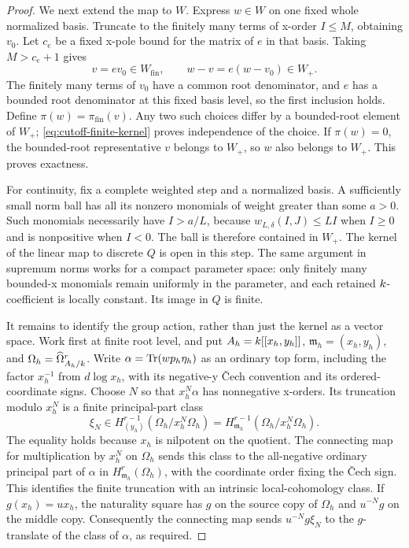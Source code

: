 \begin{proof}
We next extend the map to $W$.  Express $w\in W$ on one fixed whole
normalized basis.  Truncate to the finitely many terms of x-order
$I\leq M$, obtaining $v_0$.  Let $c_e$ be a fixed x-pole bound for
the matrix of $e$ in that basis.  Taking $M>c_e+1$ gives
\[
 v=ev_0\in W_{\mathrm{fin}},\qquad
 w-v=e(w-v_0)\in W_+.
\]
The finitely many terms of $v_0$ have a common root denominator, and
$e$ has a bounded root denominator at this fixed basis level, so the
first inclusion holds.  Define $\pi(w)=\pi_{\mathrm{fin}}(v)$.
Any two such choices differ by a bounded-root element of $W_+$;
\cref{eq:cutoff-finite-kernel} proves independence of the choice.
If $\pi(w)=0$, the bounded-root representative $v$ belongs to $W_+$,
so $w$ also belongs to $W_+$.  This proves exactness.

For continuity, fix a complete weighted step and a normalized basis.
A sufficiently small norm ball has all its nonzero monomials of
weight greater than some $a>0$.  Such monomials necessarily have
$I>a/L$, because $w_{L,\delta}(I,J)\leq LI$ when $I\geq0$ and is
nonpositive when $I<0$.  The ball is therefore contained in $W_+$.
The kernel of the linear map to discrete $Q$ is open in this step.
The same argument in supremum norms works for a compact parameter
space: only finitely many bounded-x monomials remain uniformly in
the parameter, and each retained $k$-coefficient is locally
constant.  Its image in $Q$ is finite.

It remains to identify the group action, rather than just the kernel
as a vector space.  Work first at finite root level, and put
$A_h=k[[x_h,y_h]]$, $\mathfrak m_h=(x_h,y_h)$, and
$\Omega_h=\widehat\Omega^r_{A_h/k}$.
Write $\alpha=\operatorname{Tr}(wp_h\eta_h)$ as an ordinary top form, including
the factor $x_h^{-1}$ from $d\log x_h$, with its negative-y
\v Cech convention and its ordered-coordinate signs.
Choose $N$ so that $x_h^N\alpha$ has nonnegative x-orders.  Its
truncation modulo $x_h^N$ is a finite principal-part class
\[
 \xi_N\in H^{r-1}_{(y_h)}(\Omega_h/x_h^N\Omega_h)
       =H^{r-1}_{\mathfrak m_h}(\Omega_h/x_h^N\Omega_h).
\]
The equality holds because $x_h$ is nilpotent on the quotient.
The connecting map for multiplication by $x_h^N$ on $\Omega_h$
sends this class to the all-negative ordinary principal part of
$\alpha$ in $H^r_{\mathfrak m_h}(\Omega_h)$, with the coordinate
order fixing the \v Cech sign.  This identifies the finite
truncation with an intrinsic local-cohomology class.  If
$g(x_h)=u x_h$, the naturality square has $g$ on the source copy of
$\Omega_h$ and $u^{-N}g$ on the middle copy.  Consequently the
connecting map sends $u^{-N}g\xi_N$ to the $g$-translate of the
class of $\alpha$, as required.


\end{proof}
